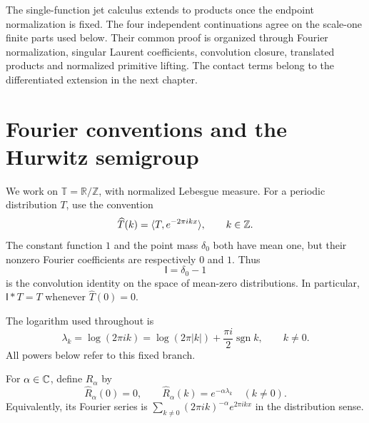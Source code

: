 \providecommand{\stconvT}{\mathbb T}
\providecommand{\stconvId}{\mathsf I}
\providecommand{\stconvG}{\mathcal G}
\providecommand{\stconvBell}{\mathcal B}
\providecommand{\stconvCT}{\operatorname{CT}}
\providecommand{\stconvFp}{\operatorname{Fp}}
\providecommand{\FP}{\operatorname{FP}}
The single-function jet calculus extends to products once the endpoint
normalization is fixed. The four independent continuations
\cite{stconv:algebra-report,stconv:shifted-report,stconv:closure-report,stconv:calculus-report}
agree on the scale-one finite parts used below. Their common proof is
organized through Fourier normalization, singular Laurent coefficients,
convolution closure, translated products and normalized primitive lifting.
The contact terms belong to the differentiated extension in the next chapter.

\section{Fourier conventions and the Hurwitz semigroup}
\label{stconv:sec:semigroup}
We work on $\stconvT=\mathbb R/\mathbb Z$, with normalized Lebesgue measure.
For a periodic distribution $T$, use the convention
\[
 \widehat T(k)=\langle T,e^{-2\pi i kx}\rangle,\qquad k\in\mathbb{Z}.
\]
The constant function $1$ and the point mass $\delta_0$ both have mean
one, but their nonzero Fourier coefficients are respectively $0$ and $1$.
Thus
\[
 \stconvId=\delta_0-1
\]
is the convolution identity on the space of mean-zero distributions. In
particular, $\stconvId*T=T$ whenever $\widehat T(0)=0$.

The logarithm used throughout is
\begin{equation}\label{stconv:eq:logbranch}
 \lambda_k=\log(2\pi i k)
 =\log(2\pi|k|)+\frac{\pi i}{2}\operatorname{sgn}k,
 \qquad k\ne0.
\end{equation}
All powers below refer to this fixed branch.

\begin{definition}\label{stconv:def:R}
For $\alpha\in\mathbb C$, define $R_\alpha$ by
\begin{equation}\label{stconv:eq:Rfourier}
 \widehat R_\alpha(0)=0,\qquad
 \widehat R_\alpha(k)=e^{-\alpha\lambda_k}\quad(k\ne0).
\end{equation}
Equivalently, its Fourier series is
$\sum_{k\ne0}(2\pi i k)^{-\alpha}e^{2\pi i kx}$ in the distribution sense.
\end{definition}

